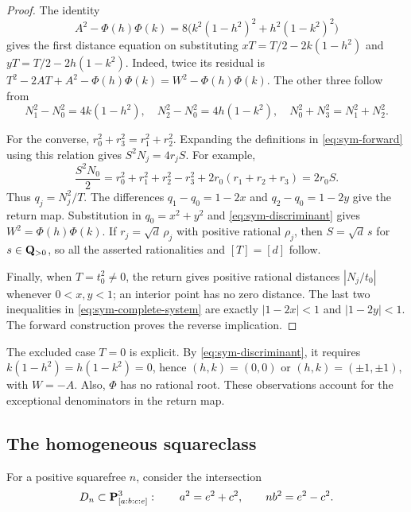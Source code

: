 \begin{proof}
The identity
\begin{equation}
 A^2-\Phi(h)\Phi(k)
 =8\bigl(k^2(1-h^2)^2+h^2(1-k^2)^2\bigr)
 \label{eq:sym-discriminant}
\end{equation}
gives the first distance equation on substituting
$xT=T/2-2k(1-h^2)$ and $yT=T/2-2h(1-k^2)$.
Indeed, twice its residual is
$T^2-2AT+A^2-\Phi(h)\Phi(k)=W^2-\Phi(h)\Phi(k)$.
The other three follow from
\[
 N_1^2-N_0^2=4k(1-h^2),\quad
 N_2^2-N_0^2=4h(1-k^2),\quad
 N_0^2+N_3^2=N_1^2+N_2^2.
\]

For the converse, $r_0^2+r_3^2=r_1^2+r_2^2$.  Expanding the
definitions in \eqref{eq:sym-forward} using this relation gives
$S^2N_j=4r_jS$.  For example,
\[
 \frac{S^2N_0}{2}
 =r_0^2+r_1^2+r_2^2-r_3^2+2r_0(r_1+r_2+r_3)
 =2r_0S.
\]
Thus $q_j=N_j^2/T$.  The differences
$q_1-q_0=1-2x$ and $q_2-q_0=1-2y$ give the return map.
Substitution in $q_0=x^2+y^2$ and
\eqref{eq:sym-discriminant} gives $W^2=\Phi(h)\Phi(k)$.
If $r_j=\sqrt d\,\rho_j$ with positive rational $\rho_j$, then
$S=\sqrt d\,s$ for $s\in\mathbf Q_{>0}$, so all the asserted
rationalities and $[T]=[d]$ follow.

Finally, when $T=t_0^2\ne0$, the return gives positive rational
distances $|N_j/t_0|$ whenever $0<x,y<1$; an interior point has no
zero distance.  The last two inequalities in
\eqref{eq:sym-complete-system} are exactly $|1-2x|<1$ and
$|1-2y|<1$.  The forward construction proves the reverse implication.
\end{proof}

The excluded case $T=0$ is explicit.  By
\eqref{eq:sym-discriminant}, it requires
$k(1-h^2)=h(1-k^2)=0$, hence
$(h,k)=(0,0)$ or $(h,k)=(\pm1,\pm1)$, with $W=-A$.
Also, $\Phi$ has no rational root.  These observations account for
the exceptional denominators in the return map.

\subsection{The homogeneous squareclass}

For a positive squarefree $n$, consider the intersection
\[
 D_n\subset\mathbf P^3_{[a:b:c:e]}:\qquad
 a^2=e^2+c^2,\qquad nb^2=e^2-c^2.
\]

